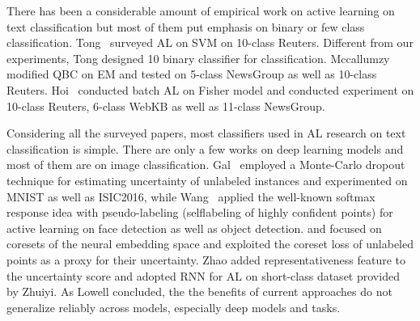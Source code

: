There has been a considerable amount of empirical work on active learning on text classification but most of them put emphasis on binary or few class classification. Tong~ surveyed AL on SVM on 10-class Reuters. Different from our experiments, Tong designed 10 binary classifier for classification. Mccallumzy~ modified QBC on EM and tested on 5-class NewsGroup as well as 10-class Reuters. Hoi~ conducted batch AL on Fisher model and conducted experiment on 10-class Reuters, 6-class WebKB as well as 11-class NewsGroup.

Considering all the surveyed papers, most classifiers used in AL research 
on text classification is simple. There are only a few works on 
deep learning models and most of them are on image classification. 
Gal~ employed a Monte-Carlo dropout 
technique for estimating uncertainty of unlabeled instances 
and experimented on MNIST as well as ISIC2016, while 
Wang~ applied the well-known softmax response 
idea with pseudo-labeling (selflabeling of highly confident points) 
for active learning on face detection as well as object detection. 
  and   focused on coresets of the neural embedding 
space and exploited the coreset loss of unlabeled points as a proxy 
for their uncertainty. Zhao  added representativeness 
feature to the uncertainty score and adopted RNN for AL on short-class dataset provided by Zhuiyi. As Lowell  concluded, the the benefits of current approaches do not generalize reliably across models, especially deep models and tasks.
